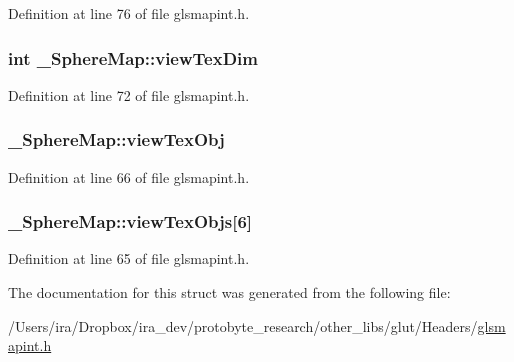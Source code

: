 Definition at line 76 of file glsmapint.\-h.

\hypertarget{struct___sphere_map_a9b58f4b38de6d3925ae1a3795074ddf1}{
\subsubsection[{view\-Tex\-Dim}]{\setlength{\rightskip}{0pt plus 5cm}int \-\_\-\-Sphere\-Map\-::view\-Tex\-Dim}}\label{struct___sphere_map_a9b58f4b38de6d3925ae1a3795074ddf1}


Definition at line 72 of file glsmapint.\-h.

\hypertarget{struct___sphere_map_ae13c3fd3977f4de76c99671d3c736f17}{
\subsubsection[{view\-Tex\-Obj}]{ \-\_\-\-Sphere\-Map\-::view\-Tex\-Obj}}\label{struct___sphere_map_ae13c3fd3977f4de76c99671d3c736f17}


Definition at line 66 of file glsmapint.\-h.

\hypertarget{struct___sphere_map_a34635ed623f295082180f1a6dae69a87}{
\subsubsection[{view\-Tex\-Objs}]{ \-\_\-\-Sphere\-Map\-::view\-Tex\-Objs\mbox{[}6\mbox{]}}}\label{struct___sphere_map_a34635ed623f295082180f1a6dae69a87}


Definition at line 65 of file glsmapint.\-h.



The documentation for this struct was generated from the following file\-:\begin{DoxyCompactItemize}
\item 
/\-Users/ira/\-Dropbox/ira\-\_\-dev/protobyte\-\_\-research/other\-\_\-libs/glut/\-Headers/\hyperlink{glsmapint_8h}{glsmapint.\-h}\end{DoxyCompactItemize}

